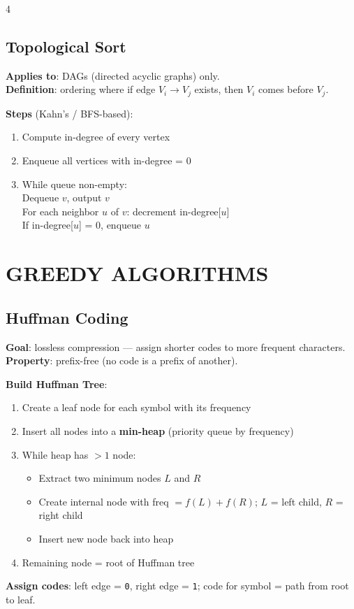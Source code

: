 \documentclass[7pt,landscape]{article}
\begin{document}
\begin{multicols}{4}
\subsection{Topological Sort}
\textbf{Applies to}: DAGs (directed acyclic graphs) only.\\
\textbf{Definition}: ordering where if edge $V_i \to V_j$ exists, then $V_i$ comes before $V_j$.

\textbf{Steps} (Kahn's / BFS-based):
\begin{enumerate}
  \item Compute in-degree of every vertex
  \item Enqueue all vertices with in-degree = 0
  \item While queue non-empty:\\
    \quad Dequeue $v$, output $v$\\
    \quad For each neighbor $u$ of $v$: decrement in-degree[$u$]\\
    \quad If in-degree[$u$] = 0, enqueue $u$
\end{enumerate}

\section{GREEDY ALGORITHMS}

\subsection{Huffman Coding}
\textbf{Goal}: lossless compression — assign shorter codes to more frequent characters.\\
\textbf{Property}: prefix-free (no code is a prefix of another).

\textbf{Build Huffman Tree}:
\begin{enumerate}
  \item Create a leaf node for each symbol with its frequency
  \item Insert all nodes into a \textbf{min-heap} (priority queue by frequency)
  \item While heap has $> 1$ node:
  \begin{itemize}
    \item Extract two minimum nodes $L$ and $R$
    \item Create internal node with freq $= f(L) + f(R)$; $L$ = left child, $R$ = right child
    \item Insert new node back into heap
  \end{itemize}
  \item Remaining node = root of Huffman tree
\end{enumerate}
\textbf{Assign codes}: left edge = \texttt{0}, right edge = \texttt{1}; code for symbol = path from root to leaf.


\end{multicols}
\end{document}
